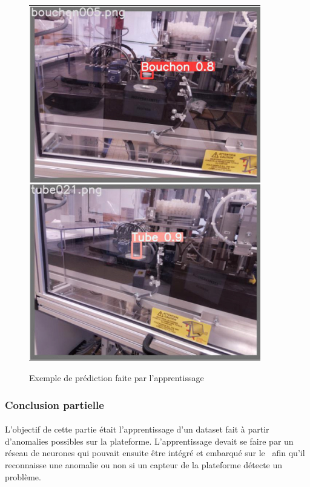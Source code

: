             \begin{figure}[H]
                \centering
            	\begin{frame}{\includegraphics[width=0.9\textwidth]{image/pred0.png}}
            	\end{frame}
            	\caption{\label{fig:pred0}Exemple de prédiction faite par l'apprentissage}
            \end{figure}
        
    
    \subsubsection{Conclusion partielle}
        \paragraph*{}
        L'objectif de cette partie était l'apprentissage d'un dataset fait à partir d'anomalies possibles sur la plateforme. L'apprentissage devait se faire par un réseau de neurones qui pouvait ensuite être intégré et embarqué sur le \rpi ~afin qu'il reconnaisse une anomalie ou non si un capteur de la plateforme détecte un problème.
        
